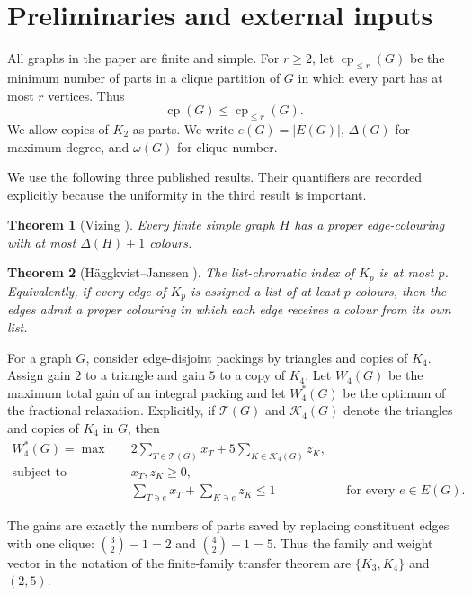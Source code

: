 \documentclass[11pt,reqno]{amsart}
\numberwithin{equation}{section}
\newtheorem{theorem}{Theorem}[section]
\theoremstyle{definition}
\theoremstyle{remark}
\newcommand{\cp}{\operatorname{cp}}
\newcommand{\cple}[1]{\operatorname{cp}_{\leq #1}}
\newcommand{\Wint}{W_4}
\newcommand{\Wfrac}{W_4^*}
\begin{document}
\section{Preliminaries and external inputs}

All graphs in the paper are finite and simple.  For $r\geq2$, let
$\cple{r}(G)$ be the minimum number of parts in a clique partition of $G$ in
which every part has at most $r$ vertices.  Thus
\[
  \cp(G)\leq \cple{r}(G).
\]
We allow copies of $K_2$ as parts.  We write $e(G)=|E(G)|$,
$\Delta(G)$ for maximum degree, and $\omega(G)$ for clique number.

We use the following three published results.  Their quantifiers are recorded
explicitly because the uniformity in the third result is important.

\begin{theorem}[Vizing \cite{Vizing1964}]\label{thm:vizing}
Every finite simple graph $H$ has a proper edge-colouring with at most
$\Delta(H)+1$ colours.
\end{theorem}

\begin{theorem}[H\"aggkvist--Janssen \cite{HaggkvistJanssen1997}]
\label{thm:HJ}
The list-chromatic index of $K_p$ is at most $p$.  Equivalently, if every edge
of $K_p$ is assigned a list of at least $p$ colours, then the edges admit a
proper colouring in which each edge receives a colour from its own list.
\end{theorem}

For a graph $G$, consider edge-disjoint packings by triangles and copies of
$K_4$.  Assign gain $2$ to a triangle and gain $5$ to a copy of $K_4$.  Let
$\Wint(G)$ be the maximum total gain of an integral packing and let
$\Wfrac(G)$ be the optimum of the fractional relaxation.  Explicitly, if
$\mathcal{T}(G)$ and $\mathcal{K}_4(G)$ denote the triangles and copies of
$K_4$ in $G$, then
\begin{equation}\label{eq:mixed-primal}
 \begin{aligned}
 \Wfrac(G)=\max\quad
   &2\sum_{T\in\mathcal{T}(G)}x_T
    +5\sum_{K\in\mathcal{K}_4(G)}z_K,\\
 \text{subject to}\quad
   &x_T,z_K\geq0,\\
   &\sum_{T\ni e}x_T+\sum_{K\ni e}z_K\leq1
       &&\text{for every }e\in E(G).
 \end{aligned}
\end{equation}

The gains are exactly the numbers of parts saved by replacing constituent
edges with one clique: $\binom32-1=2$ and $\binom42-1=5$.  Thus the family
and weight vector in the notation of the finite-family transfer theorem are
$\{K_3,K_4\}$ and $(2,5)$.
\end{document}
